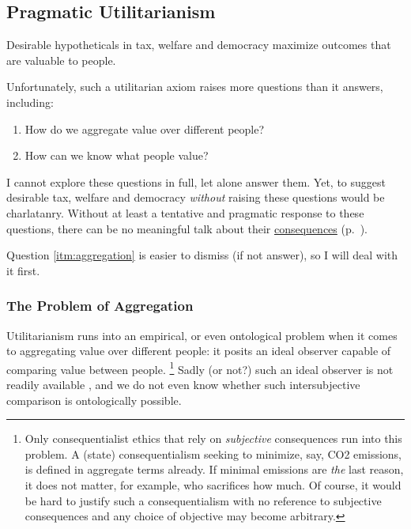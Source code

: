 \subsection[utilitarian]{Pragmatic Utilitarianism}
	\label{sec:utilitarian}

Desirable hypotheticals in tax, welfare and democracy maximize outcomes that are valuable to people.

Unfortunately, such a utilitarian axiom raises more questions than
it answers, including:

\begin{enumerate}
	\item \label{itm:aggregation}
	How do we aggregate value over different people?

	\item \label{itm:utility}
	How can we know what people value?
\end{enumerate}

I cannot explore these questions in full, let alone answer them.
Yet, to suggest desirable tax, welfare and democracy \emph{without} raising these questions would be charlatanry.
Without at least a tentative and pragmatic response to these questions, there can be no meaningful talk about their \hyperref[itm:consequentialism]{consequences} (p.~\pageref{itm:consequentialism}).

Question \ref{itm:aggregation} is easier to dismiss (if not answer), so I will deal with it first.

\subsubsection[Aggregation]{The Problem of Aggregation}
	\label{sec:aggregation}

Utilitarianism runs into an empirical, or even ontological problem when it comes to aggregating value over different people:
it posits an ideal observer capable of comparing value between people.
\footnote{
	Only consequentialist ethics that rely on \emph{subjective} consequences run into this problem.
	A (state) consequentialism seeking to minimize, say, CO2 emissions, is defined in aggregate terms already.
	If minimal emissions are \emph{the} last reason, it does not matter, for example, who sacrifices how much.
	Of course, it would be hard to justify such a consequentialism with no reference to subjective consequences and any choice of objective may become arbitrary.
}
Sadly (or not?) such an ideal observer is not readily available \citep{Rawls1988}, and we do not even know whether such intersubjective comparison is ontologically possible.

